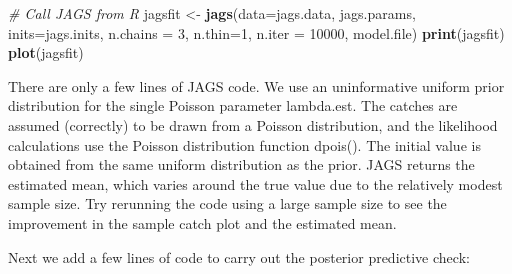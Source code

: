 \documentclass[
]{krantz}
\makeatletter
\newenvironment{Shaded}{\begin{snugshade}}{\end{snugshade}}
\newcommand{\AttributeTok}[1]{\textcolor[rgb]{0.27,0.27,0.27}{#1}}
\newcommand{\CommentTok}[1]{\textcolor[rgb]{0.37,0.37,0.37}{\textit{#1}}}
\newcommand{\DecValTok}[1]{\textcolor[rgb]{0.06,0.06,0.06}{#1}}
\newcommand{\FunctionTok}[1]{\textcolor[rgb]{0.27,0.27,0.27}{\textbf{#1}}}
\newcommand{\NormalTok}[1]{#1}
\newcommand{\OtherTok}[1]{\textcolor[rgb]{0.37,0.37,0.37}{#1}}
\newenvironment{kframe}{%
\medskip{}
\setlength{\fboxsep}{.8em}
 \def\at@end@of@kframe{}%
 \ifinner\ifhmode%
  \def\at@end@of@kframe{\end{minipage}}%
  \begin{minipage}{\columnwidth}%
 \fi\fi%
 \def\FrameCommand##1{\hskip\@totalleftmargin \hskip-\fboxsep
 \colorbox{shadecolor}{##1}\hskip-\fboxsep
     \hskip-\linewidth \hskip-\@totalleftmargin \hskip\columnwidth}%
 \MakeFramed {\advance\hsize-\width
   \@totalleftmargin\z@ \linewidth\hsize
   \@setminipage}}%
 {\par\unskip\endMakeFramed%
 \at@end@of@kframe}
\renewenvironment{Shaded}{\begin{kframe}}{\end{kframe}}
\makeatother
\begin{document}
\begin{Shaded}
\begin{Highlighting}[]
\CommentTok{\# Call JAGS from R}
\NormalTok{jagsfit }\OtherTok{\textless{}{-}} \FunctionTok{jags}\NormalTok{(}\AttributeTok{data=}\NormalTok{jags.data, jags.params, }\AttributeTok{inits=}\NormalTok{jags.inits,}
                \AttributeTok{n.chains =} \DecValTok{3}\NormalTok{, }\AttributeTok{n.thin=}\DecValTok{1}\NormalTok{, }\AttributeTok{n.iter =} \DecValTok{10000}\NormalTok{,}
\NormalTok{                model.file)}
\FunctionTok{print}\NormalTok{(jagsfit)}
\FunctionTok{plot}\NormalTok{(jagsfit)}
\end{Highlighting}
\end{Shaded}

There are only a few lines of JAGS code. We use an uninformative uniform prior distribution for the single Poisson parameter lambda.est. The catches are assumed (correctly) to be drawn from a Poisson distribution, and the likelihood calculations use the Poisson distribution function dpois(). The initial value is obtained from the same uniform distribution as the prior. JAGS returns the estimated mean, which varies around the true value due to the relatively modest sample size. Try rerunning the code using a large sample size to see the improvement in the sample catch plot and the estimated mean.

Next we add a few lines of code to carry out the posterior predictive check:
\end{document}
